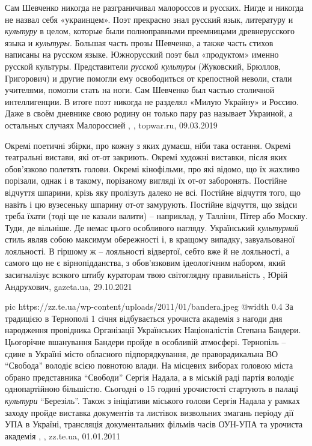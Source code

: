 Сам Шевченко никогда не разграничивал малороссов и русских. Нигде и никогда не
назвал себя «украинцем». Поэт прекрасно знал русский язык, литературу и
\emph{культуру} в целом, которые были полноправными преемницами древнерусского языка и
\emph{культуры}. Большая часть прозы Шевченко, а также часть стихов написаны на
русском языке. Южнорусский поэт был «продуктом» именно русской культуры.
Представители \emph{русской культуры} (Жуковский, Брюллов, Григорович) и другие
помогли ему освободиться от крепостной неволи, стали учителями, помогли стать
на ноги. Сам Шевченко был частью столичной интеллигенции. В итоге поэт никогда
не разделял «Милую Украйну» и Россию. Даже в своём дневнике свою родину он
только пару раз называет Украиной, а остальных случаях Малороссией
, , topwar.ru, 09.03.2019

Окремі поетичні збірки, про кожну з яких думаєш, ніби така остання.  Окремі
театральні вистави, які от-от закриють.  Окремі художні виставки, після яких
обов'язково полетять голови.  Окремі кінофільми, про які відомо, що їх жахливо
порізали, однак і в такому, порізаному вигляді їх от-от заборонять.  Постійне
відчуття шпарини, крізь яку пролізуть далеко не всі.  Постійне відчуття того,
що навіть і цю вузесеньку шпарину от-от замурують.  Постійне відчуття, що
звідси треба їхати (тоді ще не казали валити) – наприклад, у Таллінн, Пітер або
Москву. Туди, де вільніше. Де немає цього особливого нагляду.  Український
\emph{культурний} стиль являв собою максимум обережності і, в кращому випадку,
завуальованої лояльності. В гіршому ж – лояльності відвертої, себто вже й не
лояльності, а самого що не є вірнопідданства, з обов'язковим ідеологічним
набором, який засигналізує всякого штибу кураторам твою світоглядну
правильність
, 
Юрій Андрухович, gazeta.ua, 29.10.2021

\ifcmt
  pic https://zz.te.ua/wp-content/uploads/2011/01/bandera.jpeg
  @width 0.4
\fi
За традицією в Тернополі 1 січня відбувається урочиста академія з нагоди дня
народження провідника Організації Українських Націоналістів  Степана Бандери.
Цьогорічне вшанування Бандери пройде в особливій атмосфері. Тернопіль – єдине в
Україні місто обласного підпорядкування, де праворадикальна ВО \enquote{Свобода}
володіє всією повнотою влади. На місцевих виборах головою міста обрано
представника \enquote{Свободи} Сергія Надала, а в міській раді партія володіє
однопартійною більшістю.  Сьогодні о 15 годині урочистості стартують в палаці
\emph{культури} \enquote{Березіль}.  Також з ініціативи міського голови Сергія
Надала у рамках заходу пройде виставка документів та листівок визвольних
змагань періоду дії УПА в Україні, трансляція документальних фільмів часів
ОУН-УПА та урочиста академія
, 
, zz.te.ua, 01.01.2011

